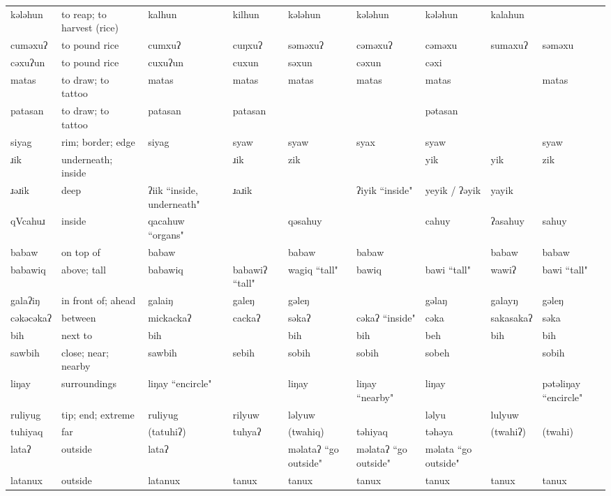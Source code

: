 \begin{landscape}
\begin{longtable}{*{9}{p{}}}
\text{*}kələhun & to reap; to harvest (rice) & kalhun & kilhun & kələhun & kələhun & kələhun & kalahun & \\
\text{*}cuməxuʔ & to pound rice & cumxuʔ & cuŋxuʔ & səməxuʔ & cəməxuʔ & cəməxu & sumaxuʔ & səməxu\\
\text{*}cəxuʔun & to pound rice & cuxuʔun & cuxun & səxun & cəxun & cəxi &  & \\
\text{*}matas & to draw; to tattoo & matas & matas & matas & matas & matas &  & matas\\
\text{*}patasan & to draw; to tattoo & patasan & patasan &  &  & pətasan &  & \\
\text{*}siyag & rim; border; edge & siyag & syaw & syaw & syax & syaw &  & syaw\\
\text{*}ɹik & underneath; inside &  & ɹik & zik &  & yik & yik & zik\\
\text{*}ɹəɹik & deep & ʔiik ``inside, underneath" & ɹaɹik &  & ʔiyik ``inside" & yeyik / ʔəyik & yayik & \\
\text{*}qVcahuɹ & inside & qacahuw ``organs" &  & qəsahuy &  & cahuy & ʔasahuy & sahuy\\
\text{*}babaw & on top of & babaw &  & babaw & babaw &  & babaw & babaw\\
\text{*}babawiq & above; tall & babawiq & babawiʔ ``tall" & wagiq ``tall" & bawiq & bawi ``tall" & wawiʔ & bawi ``tall"\\
\text{*}galaʔiŋ & in front of; ahead & galaiŋ & galeŋ & gəleŋ &  & gəlaŋ & galayŋ & gəleŋ\\
\text{*}cəkəcəkaʔ & between & mickackaʔ & cackaʔ & səkaʔ & cəkaʔ ``inside" & cəka & sakasakaʔ & səka\\
\text{*}bih & next to & bih &  & bih & bih & beh & bih & bih\\
\text{*}sawbih & close; near; nearby & sawbih & sebih & sobih & sobih & sobeh &  & sobih\\
\text{*}liŋay & surroundings & liŋay ``encircle" &  & liŋay & liŋay ``nearby" & liŋay &  & pətəliŋay ``encircle"\\
\text{*}ruliyug & tip; end; extreme & ruliyug & rilyuw & ləlyuw &  & ləlyu & lulyuw & \\
\text{*}tuhiyaq & far & (tatuhiʔ) & tuhyaʔ & (twahiq) & təhiyaq & təhəya & (twahiʔ) & (twahi)\\
\text{*}lataʔ & outside & lataʔ &  & məlataʔ ``go outside" & məlataʔ ``go outside" & məlata ``go outside" &  & \\
\text{*}latanux & outside & latanux & tanux & tanux & tanux & tanux & tanux & tanux\\

\end{longtable}
\end{landscape}
